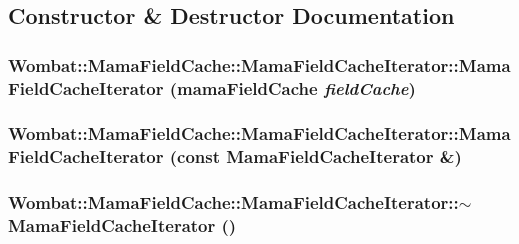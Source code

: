\subsection{Constructor \& Destructor Documentation}
\hypertarget{classWombat_1_1MamaFieldCache_1_1MamaFieldCacheIterator_a78baad6bc804023c39798741abe8940e}{
\subsubsection[{MamaFieldCacheIterator}]{\setlength{\rightskip}{0pt plus 5cm}Wombat::MamaFieldCache::MamaFieldCacheIterator::MamaFieldCacheIterator (mamaFieldCache {\em fieldCache})}}
\label{classWombat_1_1MamaFieldCache_1_1MamaFieldCacheIterator_a78baad6bc804023c39798741abe8940e}
\hypertarget{classWombat_1_1MamaFieldCache_1_1MamaFieldCacheIterator_acf28984526dc916714d0b7bcce620573}{
\subsubsection[{MamaFieldCacheIterator}]{\setlength{\rightskip}{0pt plus 5cm}Wombat::MamaFieldCache::MamaFieldCacheIterator::MamaFieldCacheIterator (const {\bf MamaFieldCacheIterator} \&)}}
\label{classWombat_1_1MamaFieldCache_1_1MamaFieldCacheIterator_acf28984526dc916714d0b7bcce620573}
\hypertarget{classWombat_1_1MamaFieldCache_1_1MamaFieldCacheIterator_abcbf2f419f126efaadcdfc4af2d7aafd}{
\subsubsection[{$\sim$MamaFieldCacheIterator}]{\setlength{\rightskip}{0pt plus 5cm}Wombat::MamaFieldCache::MamaFieldCacheIterator::$\sim$MamaFieldCacheIterator ()}}
\label{classWombat_1_1MamaFieldCache_1_1MamaFieldCacheIterator_abcbf2f419f126efaadcdfc4af2d7aafd}


